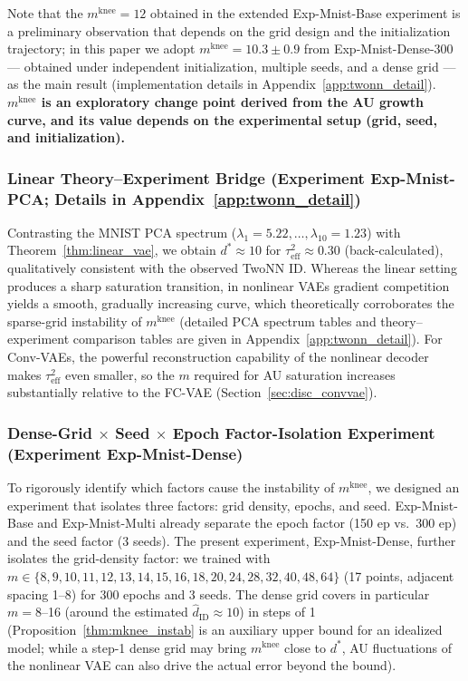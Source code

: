 \documentclass[make,article,submit,pdftex,moreauthors]{Definitions/mdpi}
\newcommand{\mknee}{m^{\mathrm{knee}}}
\begin{document}
Note that the $\mknee = 12$ obtained in the extended Exp-Mnist-Base experiment is a
preliminary observation that depends on the grid design and the initialization trajectory;
in this paper we adopt $\mknee = 10.3 \pm 0.9$ from Exp-Mnist-Dense-300 --- obtained under
independent initialization, multiple seeds, and a dense grid --- as the main result
(implementation details in Appendix~\ref{app:twonn_detail}).
\textbf{$\mknee$ is an exploratory change point derived from the AU growth curve, and its
value depends on the experimental setup (grid, seed, and initialization).}

\subsubsection{Linear Theory--Experiment Bridge (Experiment Exp-Mnist-PCA; Details in Appendix~\ref{app:twonn_detail})}\label{sec:exp_em}

Contrasting the MNIST PCA spectrum ($\lambda_1=5.22, \ldots, \lambda_{10}=1.23$) with
Theorem~\ref{thm:linear_vae}, we obtain $d^* \approx 10$ for
$\tau^2_\mathrm{eff} \approx 0.30$ (back-calculated), qualitatively consistent with the
observed TwoNN ID.
Whereas the linear setting produces a sharp saturation transition, in nonlinear VAEs gradient
competition yields a smooth, gradually increasing curve, which theoretically corroborates the
sparse-grid instability of $\mknee$ (detailed PCA spectrum tables and theory--experiment
comparison tables are given in Appendix~\ref{app:twonn_detail}).
For Conv-VAEs, the powerful reconstruction capability of the nonlinear decoder makes
$\tau^2_\mathrm{eff}$ even smaller, so the $m$ required for AU saturation increases
substantially relative to the FC-VAE (Section~\ref{sec:disc_convvae}).

\subsubsection{Dense-Grid $\times$ Seed $\times$ Epoch Factor-Isolation Experiment (Experiment Exp-Mnist-Dense)}\label{sec:exp_el}

To rigorously identify which factors cause the instability of $\mknee$, we designed an
experiment that isolates three factors: grid density, epochs, and seed.
Exp-Mnist-Base and Exp-Mnist-Multi already separate the epoch factor (150 ep vs.\ 300 ep) and
the seed factor (3 seeds).
The present experiment, Exp-Mnist-Dense, further isolates the grid-density factor: we trained
with $m \in \{8,9,10,11,12,13,14,15,16,18,20,24,28,32,40,48,64\}$
(17 points, adjacent spacing 1--8) for 300 epochs and 3 seeds.
The dense grid covers in particular $m = 8$--16 (around the estimated
$\hat{d}_\mathrm{ID} \approx 10$) in steps of 1
(Proposition~\ref{thm:mknee_instab} is an auxiliary upper bound for an idealized model; while
a step-1 dense grid may bring $\mknee$ close to $d^*$, AU fluctuations of the nonlinear VAE
can also drive the actual error beyond the bound).
\end{document}
